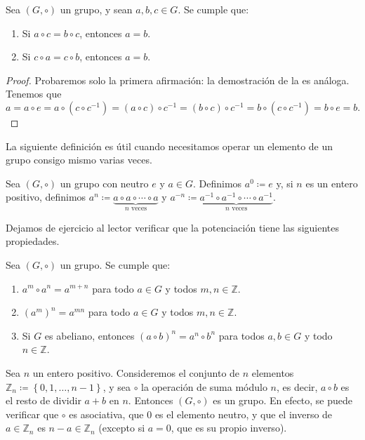 \begin{proposition} \label{cancelacion_grupos}
	Sea $(G, \circ)$ un grupo, y sean $a, b, c \in G$. Se cumple que:
	\begin{enumerate}
		\item Si $a \circ c = b \circ c$, entonces $a = b$.
		\item Si $c \circ a = c \circ b$, entonces $a = b$.
	\end{enumerate}
\end{proposition}

\begin{proof}
Probaremos solo la primera afirmación: la demostración de la es análoga. Tenemos que
$$a = a \circ e = a \circ \left( c \circ c^{-1} \right) = \left(a \circ c \right) \circ c^{-1} = \left(b \circ c \right) \circ c^{-1} = b \circ \left( c \circ c^{-1} \right) = b \circ e = b.$$
\end{proof}

La siguiente definición es útil cuando necesitamos operar un elemento de un grupo consigo mismo varias veces. 

\begin{definition}
Sea $(G, \circ)$ un grupo con neutro $e$ y $a \in G$. Definimos $a^0 \coloneqq e$ y, si $n$ es un entero positivo, definimos $a^n \coloneqq \underbrace{a \circ a \circ \cdots \circ a}_{n \text{ veces}}$ y $a^{-n} \coloneqq \underbrace{a^{-1} \circ a^{-1} \circ \cdots \circ a^{-1}}_{n \text{ veces}}$.
\end{definition}

Dejamos de ejercicio al lector verificar que la potenciación tiene las siguientes propiedades.

\begin{prop} Sea $(G, \circ)$ un grupo. Se cumple que:
	\begin{enumerate}
		\item $a^m \circ a^n = a^{m+n}$ para todo $a \in G$ y todos $m, n \in \mathbb{Z}$.
		\item $\left( a^m \right)^n = a^{mn}$ para todo $a \in G$ y todos $m, n \in \mathbb{Z}$.
		\item Si $G$ es abeliano, entonces $\left( a \circ b \right)^{n} = a^n \circ b^n$ para todos $a, b \in G$ y todo $n \in \mathbb{Z}$.
	\end{enumerate}
\end{prop}


\begin{example} \label{grupo_ciclico}
Sea $n$ un entero positivo. Consideremos el conjunto de $n$ elementos $\mathbb{Z}_n \coloneq \left\{ 0, 1, \dots, n-1 \right\}$, y sea $\circ$ la operación de suma módulo $n$, es decir, $a \circ b$ es el resto de dividir $a+b$ en $n$. Entonces $(G, \circ)$ es un grupo. En efecto, se puede verificar que $\circ$ es asociativa, que $0$ es el elemento neutro, y que el inverso de $a \in \mathbb{Z}_n$ es $n-a \in \mathbb{Z}_n$ (excepto si $a = 0$, que es su propio inverso).
\end{example}

